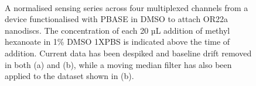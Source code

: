 \documentclass[
  a4paper,
]{scrbook}
\begin{document}
\begin{figure}
\begin{minipage}[t]{0.70\linewidth}
{{}

}

\end{minipage}%
%
\begin{minipage}[t]{0.15\linewidth}

{\centering 

~

}

\end{minipage}%

\caption{\label{fig-DMSO-sensing}A normalised sensing series across four
multiplexed channels from a device functionalised with PBASE in DMSO to
attach OR22a nanodiscs. The concentration of each 20 µL addition of
methyl hexanoate in 1\% DMSO 1XPBS is indicated above the time of
addition. Current data has been despiked and baseline drift removed in
both (a) and (b), while a moving median filter has also been applied to
the dataset shown in (b).}

\end{figure}
\end{document}
